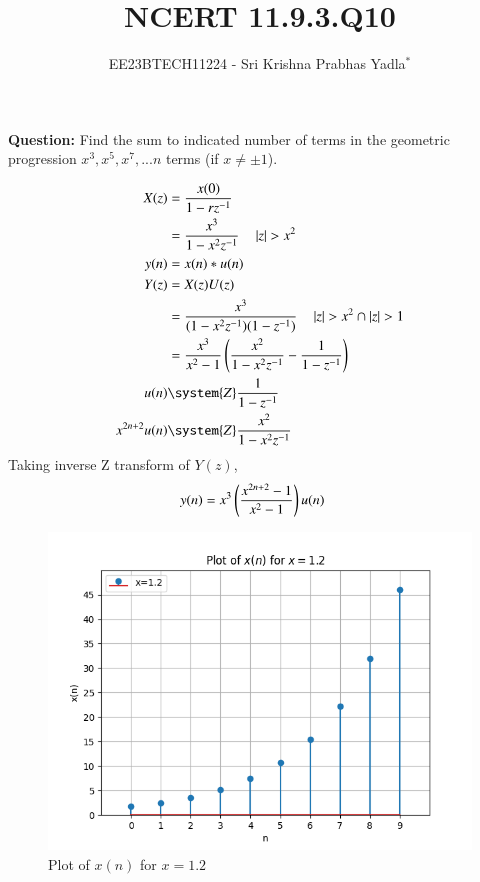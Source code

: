 \documentclass[journal,12pt,twocolumn]{IEEEtran}
\theoremstyle{remark}
\begin{document}

\vspace{3cm}

\title{NCERT 11.9.3.Q10}
\author{EE23BTECH11224 - Sri Krishna Prabhas Yadla$^{*}$%
}
\maketitle
\newpage
\bigskip

\renewcommand{\thefigure}{\arabic{figure}}
\renewcommand{\thetable}{\arabic{table}}


\vspace{3cm}
\textbf{Question:} Find the sum to indicated number of terms in the geometric progression \(x^3,x^5,x^7,...n\) terms (if \(x\neq\pm1\)).
\\
\solution

\newline
\begin{align}
	X(z) &= \frac{x(0)}{1-rz^{-1}} \\
	&= \frac{x^3}{1-x^2z^{-1}} \quad \abs{z}>x^2 \\
	y(n) &= x(n) * u(n) \\
	Y(z) &= X(z)U(z) \\
	&= \frac{x^3}{(1-x^2z^{-1})(1-z^{-1})} \quad  \abs{z} > x^2 \cap \abs{z}>1\\
	&= \frac{x^3}{x^2-1}\brak{\frac{x^2}{1-x^2z^{-1}}-\frac{1}{1-z^{-1}}} \\
	u(n) &\system{Z} \frac{1}{1-z^{-1}} \\
	x^{2n+2} u(n) &\system{Z} \frac{x^2}{1-x^2z^{-1}}
\end{align}
Taking inverse Z transform of $Y(z)$,
\begin{align}
	y(n) &= x^3\left(\frac{x^{2n+2}-1}{x^2-1}\right)u(n)
\end{align}
\begin{figure}[ht!]
	\includegraphics[width=\columnwidth]{figs/plot_2.png}
	\caption{Plot of $x(n)$ for $x=1.2$}
	\label{fig:1.2}
\end{figure}
\end{document}
